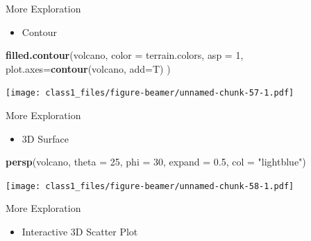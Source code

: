\documentclass[ignorenonframetext,]{beamer}
\newenvironment{Shaded}{\begin{snugshade}}{\end{snugshade}}
\newcommand{\KeywordTok}[1]{\textcolor[rgb]{0.13,0.29,0.53}{\textbf{#1}}}
\newcommand{\DataTypeTok}[1]{\textcolor[rgb]{0.13,0.29,0.53}{#1}}
\newcommand{\DecValTok}[1]{\textcolor[rgb]{0.00,0.00,0.81}{#1}}
\newcommand{\FloatTok}[1]{\textcolor[rgb]{0.00,0.00,0.81}{#1}}
\newcommand{\StringTok}[1]{\textcolor[rgb]{0.31,0.60,0.02}{#1}}
\newcommand{\CommentTok}[1]{\textcolor[rgb]{0.56,0.35,0.01}{\textit{#1}}}
\newcommand{\NormalTok}[1]{#1}
\providecommand{\tightlist}{%
  \setlength{\itemsep}{0pt}\setlength{\parskip}{0pt}}
\begin{document}
\begin{frame}[fragile]{More Exploration}

\begin{itemize}
\tightlist
\item
  Contour
\end{itemize}

\begin{Shaded}
\begin{Highlighting}[]
\KeywordTok{filled.contour}\NormalTok{(volcano, }\DataTypeTok{color =}\NormalTok{ terrain.colors, }\DataTypeTok{asp =} \DecValTok{1}\NormalTok{, }\DataTypeTok{plot.axes=}\KeywordTok{contour}\NormalTok{(volcano, }\DataTypeTok{add=}\NormalTok{T) )}
\end{Highlighting}
\end{Shaded}

\texttt{[image: class1\_files/figure-beamer/unnamed-chunk-57-1.pdf]}

\end{frame}

\begin{frame}[fragile]{More Exploration}

\begin{itemize}
\tightlist
\item
  3D Surface
\end{itemize}

\begin{Shaded}
\begin{Highlighting}[]
\KeywordTok{persp}\NormalTok{(volcano, }\DataTypeTok{theta =} \DecValTok{25}\NormalTok{, }\DataTypeTok{phi =} \DecValTok{30}\NormalTok{, }\DataTypeTok{expand =} \FloatTok{0.5}\NormalTok{, }\DataTypeTok{col =} \StringTok{"lightblue"}\NormalTok{)}
\end{Highlighting}
\end{Shaded}

\texttt{[image: class1\_files/figure-beamer/unnamed-chunk-58-1.pdf]}

\end{frame}

\begin{frame}[fragile]{More Exploration}

\begin{itemize}
\tightlist
\item
  Interactive 3D Scatter Plot
\end{itemize}

\begin{Shaded}
\end{Shaded}

\end{frame}
\end{document}
